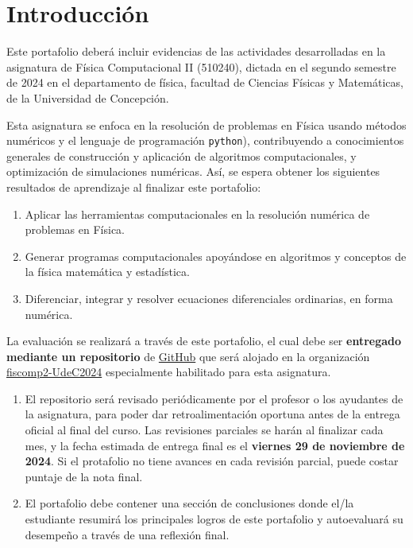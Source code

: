 \documentclass[../portafolio.tex]{subfiles}
\begin{document}

\chapter*{Introducción}

Este portafolio deberá incluir evidencias de las
actividades desarrolladas en la asignatura de Física Computacional II
(510240), dictada en el segundo semestre de 2024 en el departamento de
física, facultad de Ciencias Físicas y Matemáticas, de la Universidad
de Concepción.

\medskip

Esta asignatura se enfoca en la resolución de problemas en Física
usando métodos numéricos y el lenguaje de programación
\texttt{python}), contribuyendo a conocimientos generales de
construcción y aplicación de algoritmos computacionales, y
optimización de simulaciones numéricas. Así, se espera obtener los
siguientes resultados de aprendizaje al finalizar este portafolio:
\begin{enumerate}
\item Aplicar las herramientas computacionales en la resolución
  numérica de problemas en Física.
\item Generar programas computacionales apoyándose en algoritmos y
  conceptos de la física matemática y estadística.
\item Diferenciar, integrar y resolver ecuaciones diferenciales
  ordinarias, en forma numérica.
\end{enumerate}

\medskip

La evaluación se realizará a través de este portafolio, el cual debe
ser \textbf{entregado mediante un repositorio} de
\href{https://github.com}{GitHub} que será alojado en la organización
\href{https://github.com/fiscomp2-UdeC2024}{fiscomp2-UdeC2024}
especialmente habilitado para esta asignatura.

\begin{enumerate}
\item El repositorio será revisado periódicamente por el profesor o los ayudantes de
  la asignatura, para poder dar retroalimentación oportuna antes de la
  entrega oficial al final del curso. Las revisiones parciales se
  harán al finalizar cada mes, y la fecha estimada de entrega final es
  el \textbf{viernes 29 de noviembre de 2024}. Si el protafolio no
  tiene avances en cada revisión parcial, puede costar puntaje de la nota final.

\item El portafolio debe contener una sección de conclusiones donde
  el/la estudiante resumirá los principales logros de este portafolio
  y autoevaluará su desempeño a través de una reflexión final.
\end{enumerate}
\end{document}
